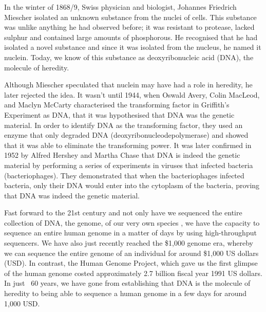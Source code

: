 \setlength{\parskip}{\baselineskip}%
\setlength{\parindent}{0pt}%

In the winter of 1868/9, Swiss physician and biologist, Johannes Friedrich Miescher isolated an unknown substance from the nuclei of cells\cite{dahm2008discovering}. This substance was unlike anything he had observed before; it was resistant to protease, lacked sulphur and contained large amounts of phosphorous. He recognised that he had isolated a novel substance and since it was isolated from the nucleus, he named it nuclein. Today, we know of this substance as deoxyribonucleic acid (DNA), the molecule of heredity.

Although Miescher speculated that nuclein may have had a role in heredity, he later rejected the idea. It wasn't until 1944, when Oswald Avery, Colin MacLeod, and Maclyn McCarty characterised the transforming factor in Griffith's Experiment\cite{griffith1928significance} as DNA, that it was hypothesised that DNA was the genetic material\cite{avery1944studies}. In order to identify DNA as the transforming factor, they used an enzyme that only degraded DNA (deoxyribonucleodepolymerase) and showed that it was able to eliminate the transforming power. It was later confirmed in 1952 by Alfred Hershey and Martha Chase that DNA is indeed the genetic material by performing a series of experiments in viruses that infected bacteria (bacteriophages)\cite{hershey1952independent}. They demonstrated that when the bacteriophages infected bacteria, only their DNA would enter into the cytoplasm of the bacteria, proving that DNA was indeed the genetic material.

Fast forward to the 21st century and not only have we sequenced the entire collection of DNA, the genome, of our very own species \cite{venter2001sequence, lander2001initial}, we have the capacity to sequence an entire human genome in a matter of days by using high-throughput sequencers. We have also just recently reached the \$1,000 genome era, whereby we can sequence the entire genome of an individual for around \$1,000 US dollars (USD). In contrast, the Human Genome Project, which gave us the first glimpse of the human genome costed approximately 2.7 billion fiscal year 1991 US dollars\cite{nhgri2010cost}. In just ~60 years, we have gone from establishing that DNA is the molecule of heredity to being able to sequence a human genome in a few days for around 1,000 USD.

